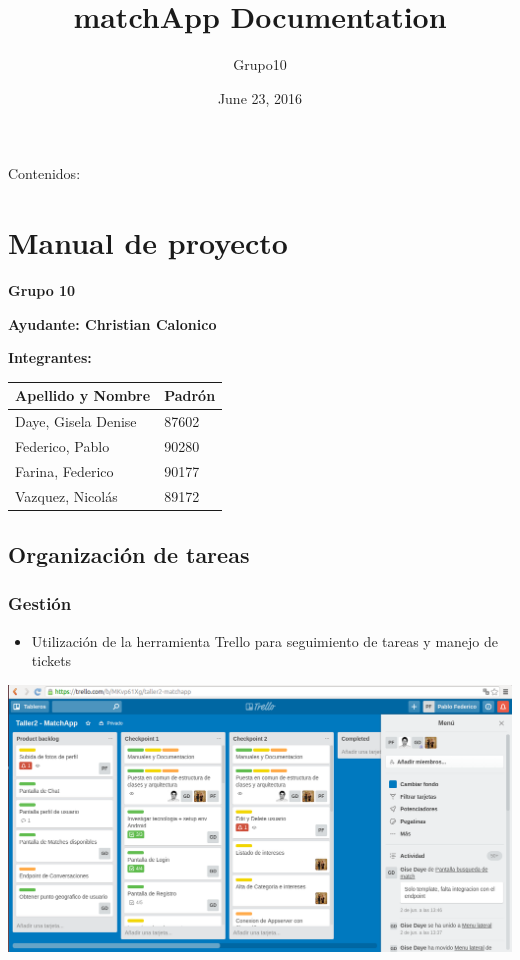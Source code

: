 \documentclass[letterpaper,10pt,english]{sphinxmanual}
\title{matchApp Documentation}
\date{June 23, 2016}
\author{Grupo10}
\begin{document}
\maketitle
\tableofcontents
{}\label{index::doc}


Contenidos:


\chapter{Manual de proyecto}
\label{manuals:manual-de-proyecto}\label{manuals::doc}\label{manuals:documentacion-de-matchapp}
\textbf{Grupo 10}

\textbf{Ayudante: Christian Calonico}

\textbf{Integrantes:}

\begin{tabulary}{\linewidth}{|L|L|}
\hline
\textsf{\relax 
Apellido y Nombre
} & \textsf{\relax 
Padrón
}\\
\hline
Daye, Gisela Denise
 & 
87602
\\
\hline
Federico, Pablo
 & 
90280
\\
\hline
Farina, Federico
 & 
90177
\\
\hline
Vazquez, Nicolás
 & 
89172
\\
\hline\end{tabulary}



\section{Organización de tareas}
\label{manuals:organizacion-de-tareas}

\subsection{Gestión}
\label{manuals:gestion}\begin{itemize}
\item {} 
Utilización de la herramienta Trello para seguimiento de tareas y manejo de tickets

\end{itemize}

\includegraphics{trello.png}
\end{document}
